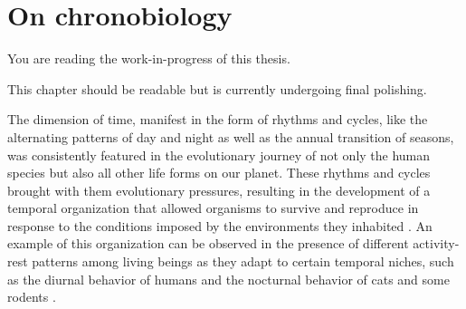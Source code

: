 \documentclass[
12pt,
openright,
oneside,
a4paper,
chapter=TITLE,
section=TITLE,
french,
spanish,
brazil,
english
]{abntex2}\usepackage{array}
\newcommand{\microskip}{\vspace{\microskipamount}}
\begin{document}

\chapter{On chronobiology}\label{on-chronobiology}

\begin{tcolorbox}[enhanced jigsaw, colframe=quarto-callout-note-color-frame, rightrule=.15mm, opacitybacktitle=0.6, toprule=.15mm, opacityback=0, toptitle=1mm, bottomtitle=1mm, breakable, leftrule=.75mm, title=\textcolor{quarto-callout-note-color}{\faInfo}\hspace{0.5em}{Note}, coltitle=black, bottomrule=.15mm, arc=.35mm, titlerule=0mm, left=2mm, colback=white, colbacktitle=quarto-callout-note-color!10!white]

You are reading the work-in-progress of this thesis.

\microskip

This chapter should be readable but is currently undergoing final
polishing.

\end{tcolorbox}

The dimension of time, manifest in the form of rhythms and cycles, like
the alternating patterns of day and night as well as the annual
transition of seasons, was consistently featured in the evolutionary
journey of not only the human species but also all other life forms on
our planet. These rhythms and cycles brought with them evolutionary
pressures, resulting in the development of a temporal organization that
allowed organisms to survive and reproduce in response to the conditions
imposed by the environments they inhabited
\autocite{pittendrigh1981,menna-barreto2003}. An example of this
organization can be observed in the presence of different activity-rest
patterns among living beings as they adapt to certain temporal niches,
such as the diurnal behavior of humans and the nocturnal behavior of
cats and some rodents \autocite{foster2005}.
\end{document}
